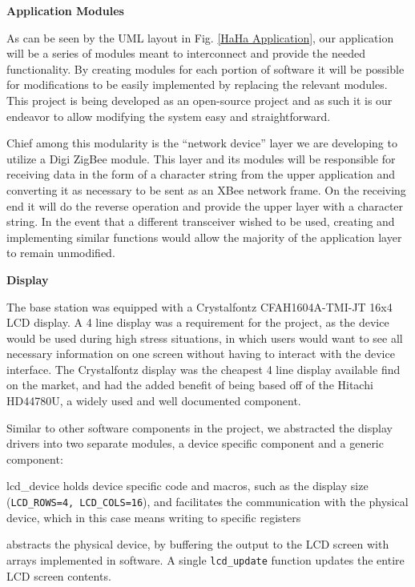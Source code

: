\documentclass[journal,compsoc]{IEEEtran}
\begin{document}
\textbf {Application Modules}

As can be seen by the UML layout in Fig. \ref{HaHa Application}, our application will be a series of modules meant to interconnect and provide the needed functionality. By creating modules for each portion of software it will be possible for modifications to be easily implemented by replacing the relevant modules. This project is being developed as an open-source project and as such it is our endeavor to allow modifying the system easy and straightforward.

Chief among this modularity is the “network device” layer we are developing to utilize a Digi ZigBee module. This layer and its modules will be responsible for receiving data in the form of a character string from the upper application and converting it as necessary to be sent as an XBee network frame. On the receiving end it will do the reverse operation and provide the upper layer with a character string. In the event that a different transceiver wished to be used, creating and implementing similar functions would allow the majority of the application layer to remain unmodified.

\textbf{Display}

The base station was equipped with a Crystalfontz CFAH1604A-TMI-JT 16x4 LCD display. A 4 line display was a requirement for the project, as the device would be used during high stress situations, in which users would want to see all necessary information on one screen without having to interact with the device interface. The Crystalfontz display was the cheapest 4 line display available find on the market, and had the added benefit of being based off of the Hitachi HD44780U, a widely used and well documented component.

Similar to other software components in the project, we abstracted the display drivers into two separate modules, a device specific component and a generic component:

\begin{LaTeXdescription}
	\item[lcd\_device] holds device specific code and macros, such as the display size (\lstinline[columns=fixed]{LCD_ROWS=4, LCD_COLS=16}), and facilitates the communication with the physical device, which in this case means writing to specific registers
    \item[lcd] abstracts the physical device, by buffering the output to the LCD screen with arrays implemented in software. A single \lstinline[columns=fixed]{lcd_update} function updates the entire LCD screen contents.
\end{LaTeXdescription}
\end{document}
